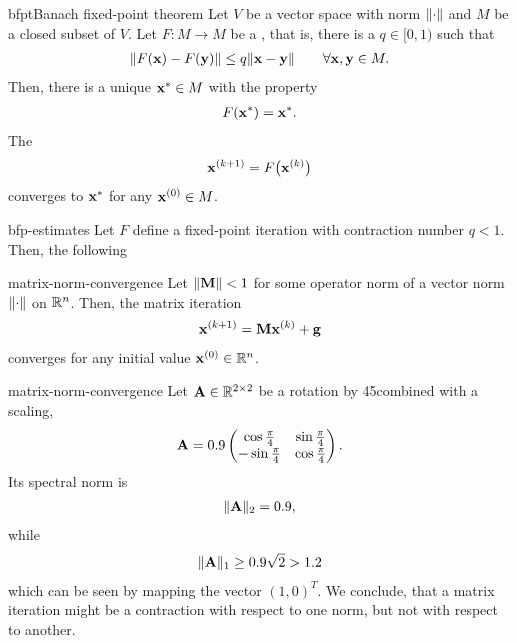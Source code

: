 \begin{Theorem*}{bfpt}{Banach fixed-point theorem}
  Let $V$ be a vector space with norm $\lVert\cdot\rVert$ and $M$ be a
  closed subset of $V$. Let $F\colon M\to M$ be a ,
  that is, there is a  $q\in[0,1)$ such that
  \begin{gather}
    \lVert F(\mathbf x)-F(\mathbf y)\rVert \le q \lVert\mathbf x-\mathbf y\rVert\qquad\forall \mathbf x,\mathbf y\in M.
  \end{gather}
  Then, there is a unique  $\mathbf x^*\in M$ with the property
  \begin{gather}
    F(\mathbf x^*) = \mathbf x^*.
  \end{gather}
  The 
  \begin{gather}
    \mathbf x^{(k+1)} = F\bigl(\mathbf x^{(k)}\bigr)
  \end{gather}
  converges to $\mathbf x^*$ for any $\mathbf x^{(0)}\in M$.
\end{Theorem*}

\begin{todo}
\begin{Corollary}{bfp-estimates}
  Let $F$ define a fixed-point iteration with contraction number $q<1$. Then, the following 
\end{Corollary}  
\end{todo}

\begin{Corollary}{matrix-norm-convergence}
  Let $\lVert\mathbf M\rVert < 1$ for some operator norm of a vector norm $\lVert\cdot\rVert$ on $\mathbb R^n$. Then, the matrix iteration
  \begin{gather}
    \mathbf x^{(k+1)} = \mathbf M \mathbf x^{(k)} + \mathbf g
  \end{gather}
  converges for any initial value $\mathbf x^{(0)}\in\mathbb R^n$.
\end{Corollary}

\begin{Example}{matrix-norm-convergence}
  Let $\mathbf A\in\mathbb R^{2\times 2}$ be a rotation by 45\textdegree combined
  with a scaling,
  \begin{gather}
    \mathbf A = 0.9
    \begin{pmatrix}
      \cos \tfrac\pi4 &\sin\tfrac\pi4\\
      -\sin\tfrac\pi4&\cos\tfrac\pi4
    \end{pmatrix}.
  \end{gather}
  Its spectral norm is
  \begin{gather}
    \lVert\mathbf A\rVert_2 = 0.9,
  \end{gather}
  while
  \begin{gather}
    \lVert\mathbf A\rVert_1 \ge 0.9\sqrt2 > 1.2
  \end{gather}
  which can be seen by mapping the vector $(1,0)^T$. We conclude, that
  a matrix iteration might be a contraction with respect to one norm,
  but not with respect to another.
\end{Example}

